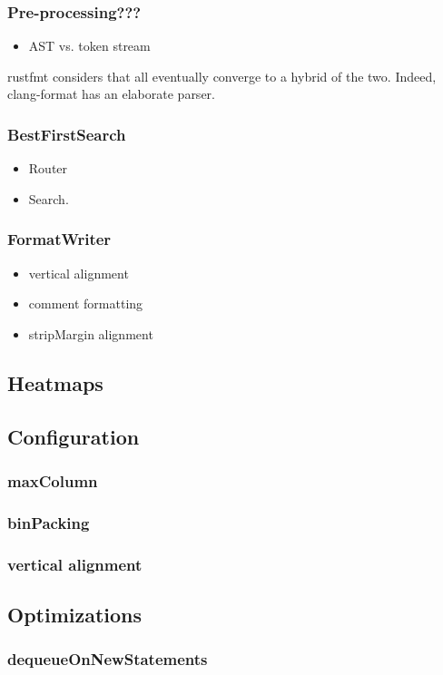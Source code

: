 \documentclass[11pt,a4paper]{article}
\begin{document}
\subsubsection{Pre-processing???}
 \begin{itemize}
   \item AST vs. token stream
 \end{itemize}
rustfmt considers that all eventually converge to a hybrid of the two.
Indeed, clang-format has an elaborate parser.
\subsubsection{BestFirstSearch}
\begin{itemize}
  \item Router
  \item Search.
\end{itemize}
\subsubsection{FormatWriter}
\begin{itemize}
  \item vertical alignment
  \item comment formatting
  \item stripMargin alignment
\end{itemize}
\subsection{Heatmaps}
\subsection{Configuration}
\subsubsection{maxColumn}
\subsubsection{binPacking}
\subsubsection{vertical alignment}
\subsection{Optimizations}
\subsubsection{dequeueOnNewStatements}
\end{document}
